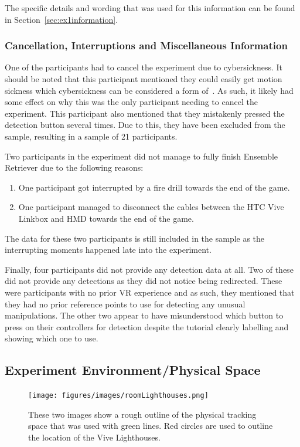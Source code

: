 The specific details and wording that was used for this information can be found in Section~\ref{sec:ex1information}.

\subsubsection{Cancellation, Interruptions and Miscellaneous Information}
One of the participants had to cancel the experiment due to cybersickness. It should be noted that this participant mentioned they could easily get motion sickness which cybersickness can be considered a form of~\cite{mousavi2013review}. As such, it likely had some effect on why this was the only participant needing to cancel the experiment. This participant also mentioned that they mistakenly pressed the detection button several times. Due to this, they have been excluded from the sample, resulting in a sample of 21 participants. 

Two participants in the experiment did not manage to fully finish Ensemble Retriever due to the following reasons:
\begin{enumerate}
    \item One participant got interrupted by a fire drill towards the end of the game.
    \item One participant managed to disconnect the cables between the HTC Vive Linkbox and HMD towards the end of the game.
\end{enumerate}

The data for these two participants is still included in the sample as the interrupting moments happened late into the experiment. 

Finally, four participants did not provide any detection data at all. Two of these did not provide any detections as they did not notice being redirected. These were participants with no prior VR experience and as such, they mentioned that they had no prior reference points to use for detecting any unusual manipulations. The other two appear to have misunderstood which button to press on their controllers for detection despite the tutorial clearly labelling and showing which one to use. 

\subsection{Experiment Environment/Physical Space}\label{sec:ex1physicalRoom}
\begin{figure}[tbph]
    \centering
    \texttt{[image: figures/images/roomLighthouses.png]}
    \caption[Image of Experiment Environment]{These two images show a rough outline of the physical tracking space that was used with green lines. Red circles are used to outline the location of the Vive Lighthouses.}
    \label{fig:ex1room}
\end{figure}

